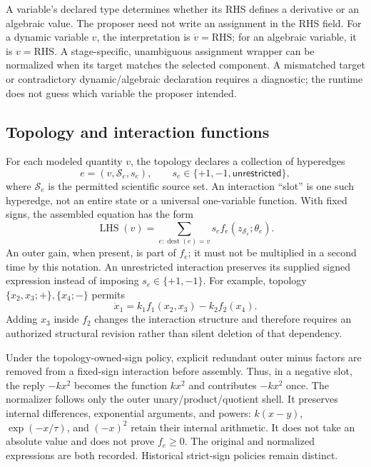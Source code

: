 \documentclass[11pt]{article}
\begin{document}
A variable's declared type determines whether its RHS defines a derivative or
an algebraic value. The proposer need not write an assignment in the RHS field.
For a dynamic variable $v$, the interpretation is $\dot v=\mathrm{RHS}$; for an
algebraic variable, it is $v=\mathrm{RHS}$. A stage-specific, unambiguous assignment
wrapper can be normalized when its target matches the selected component.
A mismatched target or contradictory dynamic/algebraic declaration requires a
diagnostic; the runtime does not guess which variable the proposer intended.

\subsection{Topology and interaction functions}
For each modeled quantity $v$, the topology declares a collection of hyperedges
\begin{equation}
 e=(v,\mathcal S_e,s_e),\qquad
 s_e\in\{+1,-1,\mathsf{unrestricted}\},
\end{equation}
where $\mathcal S_e$ is the permitted scientific source set. An interaction
``slot'' is one such hyperedge, not an entire state or a universal one-variable
function. With fixed signs, the assembled equation has the form
\begin{equation}
 \operatorname{LHS}(v)=\sum_{e:\operatorname{dest}(e)=v}
 s_e f_e(z_{\mathcal S_e};\theta_e).
 \label{eq:assembly}
\end{equation}
An outer gain, when present, is part of $f_e$; it must not be multiplied in a
second time by this notation. An unrestricted interaction preserves its supplied
signed expression instead of imposing $s_e\in\{+1,-1\}$.
For example, topology $\{x_2,x_3;+\},\{x_4;-\}$ permits
\begin{equation}
 \dot x_1=k_1f_1(x_2,x_3)-k_2f_2(x_4).
\end{equation}
Adding $x_3$ inside $f_2$ changes the interaction structure and therefore requires
an authorized structural revision rather than silent deletion of that dependency.

Under the topology-owned-sign policy, explicit redundant outer minus factors are
removed from a fixed-sign interaction before assembly. Thus, in a negative slot,
the reply $-k x^2$ becomes the function $k x^2$ and contributes $-k x^2$ once.
The normalizer follows only the outer unary/product/quotient shell. It preserves
internal differences, exponential arguments, and powers: $k(x-y)$,
$\exp(-x/\tau)$, and $(-x)^2$ retain their internal arithmetic. It does not take
an absolute value and does not prove $f_e\geq0$. The original and normalized
expressions are both recorded. Historical strict-sign policies remain distinct.
\end{document}
